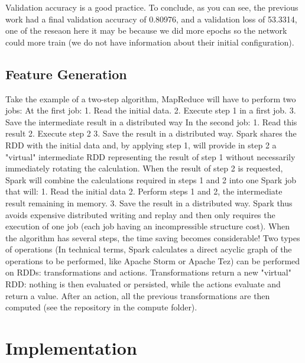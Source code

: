 \documentclass{acmtog} %
\begin{document}
Validation accuracy is a good practice.
To conclude, as you can see, the previous work had a final validation accuracy of 0.80976, and a validation loss of 53.3314, one of the reseaon here it may be because we did more epochs so the network could more train (we do not have information about their initial configuration).

\subsection{Feature Generation}
\label{subsub:featureGeneration}

Take the example of a two-step algorithm, MapReduce will have to perform two jobs:
At the first job:
1.	Read the initial data.
2.	Execute step 1 in a first job.
3.	Save the intermediate result in a distributed way
In the second job:
1.	Read this result
2.	Execute step 2
3.	Save the result in a distributed way.
Spark shares the RDD with the initial data and, by applying step 1, will provide in step 2 a "virtual" intermediate RDD representing the result of step 1 without necessarily immediately rotating the calculation. When the result of step 2 is requested, Spark will combine the calculations required in steps 1 and 2 into one Spark job that will:
1.	Read the initial data
2.	Perform steps 1 and 2, the intermediate result remaining in memory.
3.	Save the result in a distributed way.
Spark thus avoids expensive distributed writing and replay and then only requires the execution of one job (each job having an incompressible structure cost).
When the algorithm has several steps, the time saving becomes considerable!
Two types of operations (In technical terms, Spark calculates a direct acyclic graph of the operations to be performed, like Apache Storm or Apache Tez) can be performed on RDDs: transformations and actions. Transformations return a new "virtual" RDD: nothing is then evaluated or persisted, while the actions evaluate and return a value. After an action, all the previous transformations are then computed (see the repository in the compute folder).

\section{Implementation}
\label{sec:implementation}
\end{document}
